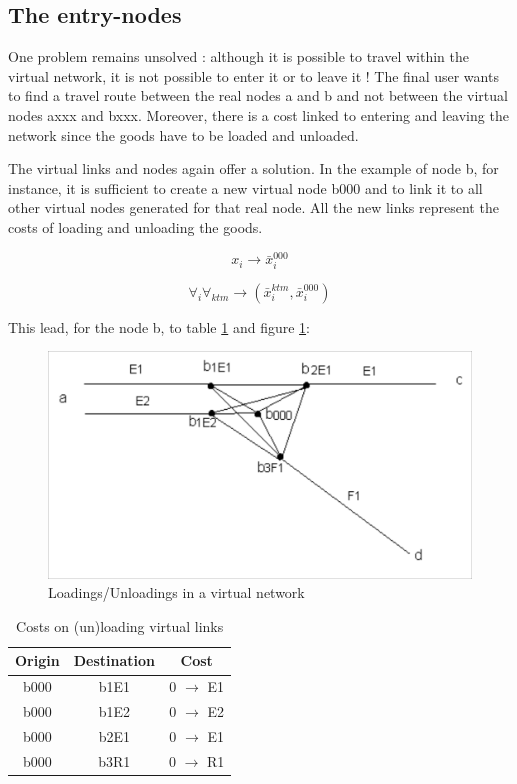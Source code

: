 



\subsection{The entry-nodes}


One problem remains unsolved : although it is possible to travel within the
virtual network, it is not possible to enter it or to leave it !  The final
user wants to find a travel route between the real nodes a and b and not between
the virtual nodes axxx and bxxx.  Moreover, there is a cost linked to entering
and leaving the network since the goods have to be loaded and unloaded.

The virtual links and nodes again offer a solution.  In the example of node b,
for instance, it is sufficient to create a new virtual node b000 and to link it
to all other virtual nodes generated for that real node.  All the new links
represent the costs of loading and unloading the goods.


$$x_i \rightarrow \bar x_i^{000}$$

$$\forall_i \forall_{ktm} \rightarrow (\bar x_i^{ktm}, \bar x_i^{000})$$



This lead, for the node b, to table \ref{tab3_5} and figure \ref{f3_7}:


\begin{figure}[htbp]
\centerline{\includegraphics[width=12cm]{f3_7.png}}
\caption{\label{f3_7} Loadings/Unloadings in a virtual network}
\end{figure}

\begin{table}[htbp]
\begin{center}
\begin{tabular}{ccc}
\hline
Origin & Destination & Cost\\
\hline
b000 & b1E1 & 0 $\rightarrow$ E1\\

b000 & b1E2 & 0 $\rightarrow$ E2\\

b000 & b2E1 & 0 $\rightarrow$ E1\\

b000 & b3R1 & 0 $\rightarrow$ R1\\
\hline
\end{tabular}
\caption{\label{tab3_5} Costs on (un)loading virtual links}
\end{center}
\end{table}

